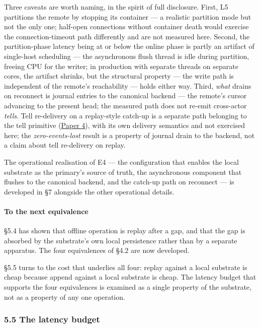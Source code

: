 \documentclass[
]{article}
\begin{document}
Three caveats are worth naming, in the spirit of full disclosure. First,
L5 partitions the remote by stopping its container --- a realistic
partition mode but not the only one; half-open connections without
container death would exercise the connection-timeout path differently
and are not measured here. Second, the partition-phase latency being at
or below the online phase is partly an artifact of single-host
scheduling --- the asynchronous flush thread is idle during partition,
freeing CPU for the writer; in production with separate threads on
separate cores, the artifact shrinks, but the structural property ---
the write path is independent of the remote's reachability --- holds
either way. Third, \emph{what} drains on reconnect is journal entries to
the canonical backend --- the remote's cursor advancing to the present
head; the measured path does not re-emit cross-actor \emph{tells}. Tell
re-delivery on a replay-style catch-up is a separate path belonging to
the tell primitive (\href{04-cross-actor-continuity.md}{Paper 4}), with
its own delivery semantics and not exercised here; the
\emph{zero-events-lost} result is a property of journal drain to the
backend, not a claim about tell re-delivery on replay.

The operational realisation of E4 --- the configuration that enables the
local substrate as the primary's source of truth, the asynchronous
component that flushes to the canonical backend, and the catch-up path
on reconnect --- is developed in §7 alongside the other operational
details.

\paragraph{To the next equivalence}\label{to-the-next-equivalence-2}

§5.4 has shown that offline operation is replay after a gap, and that
the gap is absorbed by the substrate's own local persistence rather than
by a separate apparatus. The four equivalences of §4.2 are now
developed.

§5.5 turns to the cost that underlies all four: replay against a local
substrate is cheap because append against a local substrate is cheap.
The latency budget that supports the four equivalences is examined as a
single property of the substrate, not as a property of any one
operation.

\subsubsection{5.5 The latency budget}\label{the-latency-budget}
\end{document}
